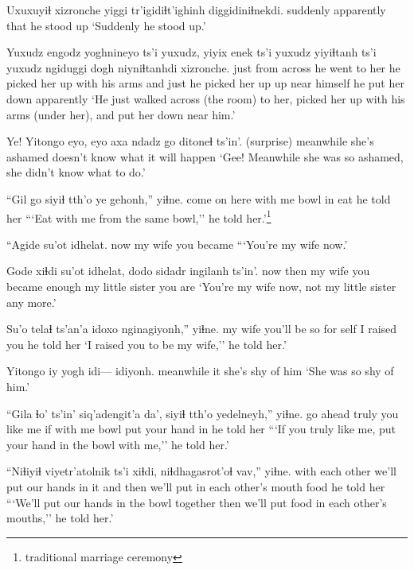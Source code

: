\documentclass[12pt]{article}
\begin{document}
\gll Uxuxuyiɬ xizronche  yiggi tr'igidiɬt'ighinh {diggidiniɬnekdi}.
suddenly apparently that  {}           {he stood up}
\glt `Suddenly he stood up.'
\glend

\gll Yuxudz engodz      yoghnineyo    ts'i yuxudz, {yiyix enek}                 ts'i yuxudz yiyiɬtanh   ts'i       yuxudz ngiduggi dogh           niyniɬtanhdi  xizronche.
just   {from across} {he went to her} {} {} {he picked her up with his arms} and  just   {he picked her up} {}    {}   up      {near himself} {he put her down}    apparently
\glt `He just walked across (the room) to her, picked her up with his arms (under her), and put her down near him.'
\glend

\gll Ye! Yitongo   {eyo, eyo   axa}  {ndadz go} ditoneɬ ts'in'.
(surprise) meanwhile {she's ashamed} {doesn't know what} {it will happen}
\glt `Gee! Meanwhile she was so ashamed, she didn't know what to do.'
\glend

\gll ``Gil     go   siyiɬ   tth'o ye gehonh,''      yiɬne.
{come on} here {with me} bowl in {eat} {he told her}
\glt ```Eat with me from the same bowl,'' he told her.'\footnote{traditional marriage ceremony}
\glend

\gll ``Agide su'ot    idhelat.
now   {my wife} {you became}
\glt ```You're my wife now.'
\glend

\gll Gode xiɬdi su'ot    idhelat, dodo   sidadr           ingilanh ts'in'.
now  then   {my wife} {you became} enough {my little sister} {you are}
\glt `You're my wife now, not my little sister any more.'
\glend

\gll Su'o    telaɬ     ts'an'a idoxo    nginagiyonh,'' yiɬne.
{my wife} {you'll be} so   {for self} {I raised you} {he told her}
\glt `I raised you to be my wife,'' he told her.'
\glend

\gll Yitongo   iy {yogh idi--- idiyonh.}
meanwhile it {she's shy of him}
\glt `She was so shy of him.'
\glend

\gll ``Gila {ɬo' ts'in'} siq'adengit'a da', siyiɬ   tth'o yedelneyh,'' yiɬne.
{go ahead}     truly      {you like me}   if  {with me} bowl {put your hand in} {he told her}
\glt ```If you truly like me, put your hand in the bowl with me,'' he told her.'
\glend

\gll ``Niɬiyiɬ         viyetr'atolnik            ts'i xiɬdi, niɬdhagasrot'oɬ              vav,''  yiɬne.
{with each other} {we'll put our hands in it} and  then  {we'll put in each other's mouth} food {he told her}
\glt ```We'll put our hands in the bowl together then we'll put food in each other's mouths,'' he told her.'
\glend
\end{document}
